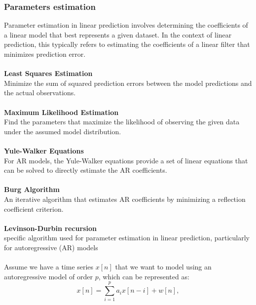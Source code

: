\documentclass[12pt]{article}
\begin{document}
    \subsubsection{Parameters estimation}\label{parameterslp}
    Parameter estimation in linear prediction involves determining the coefficients of a linear
    model that best represents a given dataset. In the context of linear prediction, this typically
    refers to estimating the coefficients of a linear filter that minimizes prediction error.\\
    \\
    \textbf{Least Squares Estimation}\\
    Minimize the sum of squared prediction errors between the model predictions and the actual
    observations.\\
    \\
    \textbf{Maximum Likelihood Estimation}\\
    Find the parameters that maximize the likelihood of observing the given data under the assumed
    model distribution.\\
    \\
    \textbf{Yule-Walker Equations}\\
    For AR models, the Yule-Walker equations provide a set of linear equations that can be solved
    to directly estimate the AR coefficients.\\
    \\
    \textbf{Burg Algorithm}\\
    An iterative algorithm that estimates AR coefficients by minimizing a reflection coefficient
    criterion.\\
    \\
    \textbf{Levinson-Durbin recursion}\\
    specific algorithm used for parameter estimation in linear prediction, particularly for
    autoregressive (AR) models\\
    \\
    Assume we have a time series \( x[n] \) that we want to model using an autoregressive model of order \( p \), which can be represented as:
    \begin{equation}
        x[n] = \sum_{i=1}^{p} a_i x[n-i] + w[n],
    \end{equation}
\end{document}
